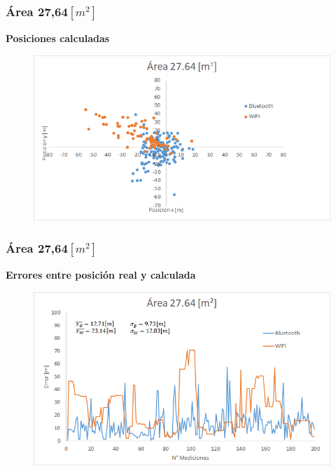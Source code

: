 \documentclass[mathserif]{beamer}
\begin{document}

\begin{frame}
\frametitle{Área 27,64$[m^2]$}

\textbf{Posiciones calculadas}

\begin{figure}
\includegraphics[width=\textwidth]{../figures_chesta/resultados/posicion__27_64}
\end{figure}


\end{frame}


\begin{frame}
\frametitle{Área 27,64$[m^2]$}

\textbf{Errores entre posición real y calculada}

\begin{figure}
\includegraphics[width=\textwidth]{../figures_chesta/resultados/area__27_64}
\end{figure}



\end{frame}
\end{document}
